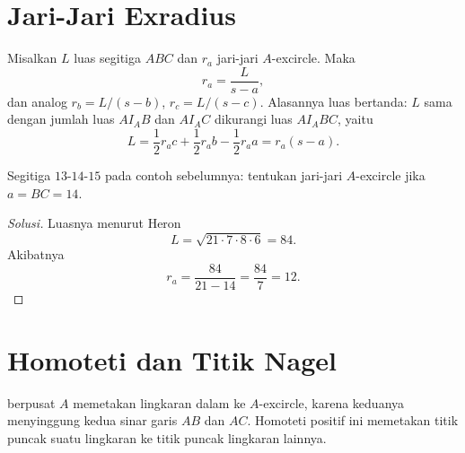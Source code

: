 \documentclass[12pt]{scrartcl}
\begin{document}
\section{Jari-Jari Exradius}

\begin{fact}
Misalkan $L$ luas segitiga $ABC$ dan $r_a$ jari-jari $A$-excircle. Maka
\[ r_a = \frac{L}{s - a}, \]
dan analog $r_b = L/(s - b)$, $r_c = L/(s - c)$.
Alasannya luas bertanda: $L$ sama dengan jumlah luas $AI_AB$ dan $AI_AC$
dikurangi luas $AI_ABC$, yaitu
\[ L = \frac12 r_a c + \frac12 r_a b - \frac12 r_a a
= r_a(s - a). \]
\end{fact}

\begin{example}
Segitiga $13$-$14$-$15$ pada contoh sebelumnya:
tentukan jari-jari $A$-excircle jika $a = BC = 14$.
\end{example}
\begin{proof}[Solusi]
Luasnya menurut Heron
\[ L = \sqrt{21 \cdot 7 \cdot 8 \cdot 6} = 84. \]
Akibatnya
\[ r_a = \frac{84}{21 - 14} = \frac{84}{7} = 12. \]
\end{proof}

\section{Homoteti dan Titik Nagel}

\begin{fact}
 berpusat $A$ memetakan lingkaran dalam
ke $A$-excircle, karena keduanya menyinggung kedua sinar garis $AB$
dan $AC$. Homoteti positif ini memetakan titik puncak suatu lingkaran
ke titik puncak lingkaran lainnya.
\end{fact}
\end{document}
